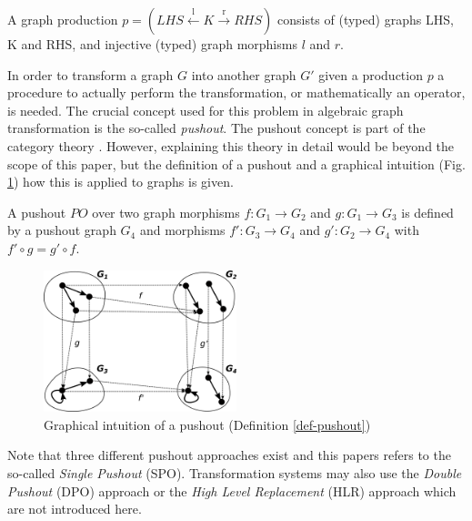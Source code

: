 \documentclass[runningheads]{llncs}
\begin{document}
\begin{definition}\label{graph-production}
A graph production $p = (LHS \xleftarrow{\text{l}} K \xrightarrow{\text{r}} RHS)$ consists of (typed) graphs LHS, K and RHS, and injective (typed) graph morphisms $l$ and $r$.
\end{definition}

\noindent
In order to transform a graph $G$ into another graph $G'$ given a production $p$ a procedure to actually perform the transformation, or mathematically an operator, is needed. The crucial concept used for this problem in algebraic graph transformation \cite{DBLP:series/eatcs/EhrigEPT06} is the so-called \textit{pushout}. The pushout concept is part of the category theory \cite{MAHFOUDH2015212,barr1990category}. However, explaining this theory in detail would be beyond the scope of this paper, but the definition of a pushout and a graphical intuition (Fig. \ref{fig:example-graph-pushout}) how this is applied to graphs is given.

\begin{definition}[Pushout]\label{def-pushout}
	A pushout $PO$ over two graph morphisms $f : G_1 \to G_2$ and $g : G_1 \to G_3$ is defined by a pushout graph $G_4$ and morphisms $f' : G_3 \to G_4$ and $g' : G_2 \to G_4$ with $f' \circ g = g' \circ f$.
\end{definition}

\begin{figure}[H]
	\centering
	\includegraphics[width=0.5\textwidth]{pushout_graph}
	\caption{Graphical intuition of a pushout (Definition \ref{def-pushout}) \cite{tutorial-agt}}
	\label{fig:example-graph-pushout}
\end{figure}

\noindent
Note that three different pushout approaches exist and this papers refers to the so-called \textit{Single Pushout} (SPO)\cite{LOWE1993181}. Transformation systems may also use the \textit{Double Pushout} (DPO) approach \cite{10.1007/BFb0025714} or the \textit{High Level Replacement} (HLR) approach \cite{EHPP04} which are not introduced here. 
\end{document}
